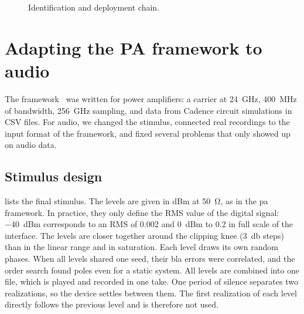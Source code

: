 \begin{figure}[htbp]
  \centering
  \caption{Identification and deployment chain.}
  \label{fig:impl_overview}
\end{figure}


\section{Adapting the PA framework to audio}
\label{sec:impl_audio_port}

The framework~\cite{pwh_pa_code} was written for power amplifiers: a carrier at \SI{24}{\giga\hertz}, \SI{400}{\mega\hertz} of bandwidth, \SI{256}{\giga\hertz} sampling, and data from Cadence circuit simulations in CSV files. For audio, we changed the stimulus, connected real recordings to the input format of the framework, and fixed several problems that only showed up on audio data.

\subsection{Stimulus design}
\label{subsec:impl_stimulus}

 lists the final stimulus. The levels are given in dBm at \SI{50}{\ohm}, as in the \gls{pa} framework. In practice, they only define the RMS value of the digital signal: \SI{-40}{dBm} corresponds to an RMS of 0.002 and \SI{0}{dBm} to 0.2 in full scale of the interface. The levels are closer together around the clipping knee (\SI{3}{\decibel} steps) than in the linear range and in saturation. Each level draws its own random phases. When all levels shared one seed, their \gls{bla} errors were correlated, and the order search found poles even for a static system. All levels are combined into one file, which is played and recorded in one take. One period of silence separates two realizations, so the device settles between them. The first realization of each level directly follows the previous level and is therefore not used.

